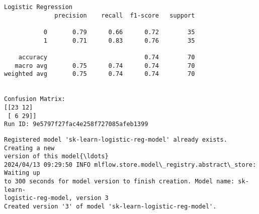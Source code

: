\documentclass[11pt]{article}
\begin{document}
    \begin{Verbatim}[commandchars=\\\{\}]
Logistic Regression
              precision    recall  f1-score   support

           0       0.79      0.66      0.72        35
           1       0.71      0.83      0.76        35

    accuracy                           0.74        70
   macro avg       0.75      0.74      0.74        70
weighted avg       0.75      0.74      0.74        70


Confusion Matrix:
[[23 12]
 [ 6 29]]
Run ID: 9e5797f27fac4e258f727085afeb1399
    \end{Verbatim}

    \begin{Verbatim}[commandchars=\\\{\}]
Registered model 'sk-learn-logistic-reg-model' already exists. Creating a new
version of this model{\ldots}
2024/04/13 09:29:50 INFO mlflow.store.model\_registry.abstract\_store: Waiting up
to 300 seconds for model version to finish creation. Model name: sk-learn-
logistic-reg-model, version 3
Created version '3' of model 'sk-learn-logistic-reg-model'.
    \end{Verbatim}
\end{document}
